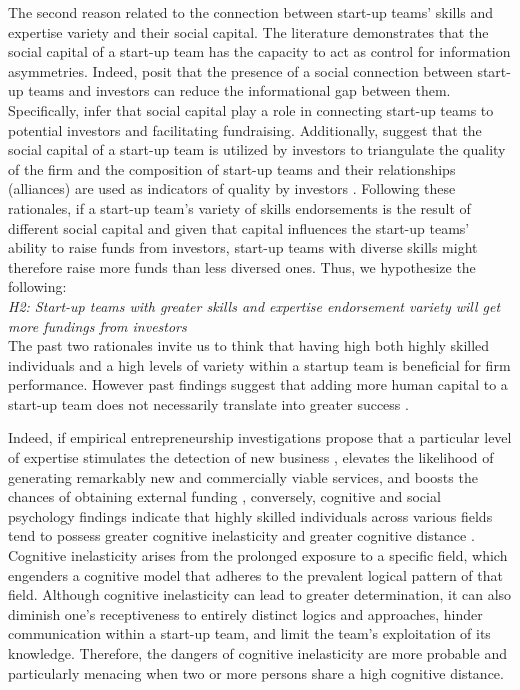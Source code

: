\documentclass[12pt]{article}
\begin{document}
The second reason related to the connection between start-up teams' skills and expertise variety and their social capital. The literature demonstrates that the social capital of a start-up team has the capacity to act as control for information asymmetries. Indeed, \citet{huang2017resources, shane2002organizational} posit that the presence of a social connection between start-up teams and investors can reduce the informational gap between them. Specifically, \citet{shane2002network} infer that social capital play a role in connecting start-up teams to potential investors and facilitating fundraising. Additionally, \citet{hoenig2015quality} suggest that the social capital of a start-up team is utilized by investors to triangulate the quality of the firm and the composition of start-up teams and their relationships (alliances) are used as indicators of quality by investors \citep{plummer2016better, semrau2014exactly}. Following these rationales, if a start-up team's variety of skills endorsements is the result of different social capital and given that capital influences the start-up teams' ability to raise funds from investors, start-up teams with diverse skills might therefore raise more funds than less diversed ones. Thus, we hypothesize the following: \\

\noindent \textit{H2: Start-up teams with greater skills and expertise endorsement variety will get more fundings from investors} \\

The past two rationales invite us to think that having high both highly skilled individuals and a high levels of variety within a startup team is beneficial for firm performance. However past findings suggest that adding more human capital to a start-up team does not necessarily translate into greater success \citep{pierce2013too}.

Indeed, if empirical entrepreneurship investigations propose that a particular level of expertise stimulates the detection of new business \citep{shane2000promise, marvel2016human}, elevates the likelihood of generating remarkably new and commercially viable services, and boosts the chances of obtaining external funding \citep{beckman2007early, marvel2007technology}, conversely, cognitive and social psychology findings indicate that highly skilled individuals across various fields tend to possess greater cognitive inelasticity and greater cognitive distance \citep{nooteboom2007optimal}. Cognitive inelasticity arises from the prolonged exposure to a specific field, which engenders a cognitive model that adheres to the prevalent logical pattern of that field. Although cognitive inelasticity can lead to greater determination, it can also diminish one's receptiveness to entirely distinct logics and approaches, hinder communication within a start-up team, and limit the team's exploitation of its knowledge. Therefore, the dangers of cognitive inelasticity are more probable and particularly menacing when two or more persons share a high cognitive distance.
\end{document}
